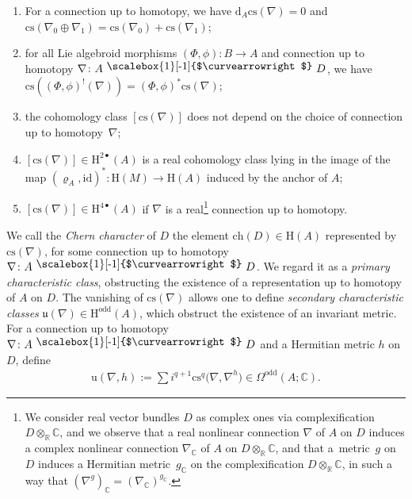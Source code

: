 \documentclass[pdftex]{sigma}
\numberwithin{equation}{section}
\newcommand{\R}{\mathbb{R}}
\newcommand{\homo}{ \ \raisebox{\depth}{\scalebox{1}[-1]{$\curvearrowright$}} \ }
\newcommand{\C}{\mathbb{C}}
\newcommand{\dd}{\mathrm{d}}
\newcommand{\HH}{\mathrm{H}}
\newcommand{\id}{\mathrm{id}}
\newcommand{\8}{\infty}
\begin{document}
\begin{proposition}\label{pro : primary}\quad
 \begin{enumerate}\itemsep=0pt
 \item[$a)$] For a connection up to homotopy, we have $\dd_A\mathrm{cs}(\nabla) = 0$ and $\mathrm{cs}(\nabla_0 \oplus \nabla_1)=\mathrm{cs}(\nabla_0)+\mathrm{cs}(\nabla_1)$;
 \item[$b)$] for all Lie algebroid morphisms $(\Phi,\phi)\colon B \to A$ and connection up to homotopy $\nabla\colon A \homo D$, we have $\mathrm{cs}((\Phi,\phi)^!(\nabla)) = (\Phi,\phi)^*\mathrm{cs}(\nabla)$;
 \item[$c)$] the cohomology class $[\mathrm{cs}(\nabla)]$ does not depend on the choice of connection up to homotopy~$\nabla$;
 \item[$d)$] $[\mathrm{cs}(\nabla)] \!\in\! \mathrm{H}^{2\bullet}(A)$ is a real cohomology class lying in the image of the map $(\varrho_A,\id)^*\colon \HH(M) \!\to\! \HH(A)$ induced by the anchor of $A$;
 \item[$e)$] $[\mathrm{cs}(\nabla)] \in \mathrm{H}^{4\bullet}(A)$ if $\nabla$ is a real\footnote{We consider real vector bundles $D$ as complex ones via complexification $D \otimes_{\R}\C$, and we observe that a real nonlinear connection $\nabla$ of $A$ on $D$ induces a complex nonlinear connection $\nabla_{\C}$ of $A$ on $D \otimes_{\R}\C$, and that a~metric~$g$ on $D$ induces a Hermitian metric~$g_{\C}$ on the complexification $D \otimes_{\R}\C$, in such a way that $(\nabla^g)_{\C} = (\nabla_{\C})^{g_{\C}}$.} connection up to homotopy.
 \end{enumerate}
\end{proposition}

We call the {\it Chern character} of $D$ the element $\mathrm{ch}(D) \in \mathrm{H}(A)$ represented by $\mathrm{cs}(\nabla)$, for some connection up to homotopy $\nabla\colon A \homo D$. We regard it as a {\it primary characteristic class}, obstructing the existence of a representation up to homotopy of $A$ on $D$. The vanishing of $\mathrm{cs}(\nabla)$ allows one to define {\it secondary characteristic classes} $\mathfrak{u}(\nabla) \in \mathrm{H}^{\mathrm{odd}}(A)$, which obstruct the existence of an invariant metric. For a connection up to homotopy $\nabla\colon A \homo D$ and a Hermitian metric $h$ on $D$, define
\begin{gather*}
 \mathrm{u}(\nabla,h):= \sum i^{q+1}\mathrm{cs}^q\big(\nabla,\nabla^h\big) \in \Omega^{\mathrm{odd}}(A;\C).
\end{gather*}
\end{document}
